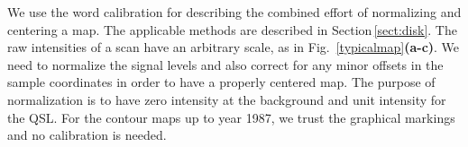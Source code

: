 \documentclass{aa}
\begin{document}
We use the word calibration for describing the combined effort of normalizing and centering a map. The applicable 
methods are described in Section\,\ref{sect:disk}. The raw intensities of a scan have an arbitrary scale, as in Fig.~\ref{typicalmap}{\bf(a-c)}. We 
need to normalize the signal levels and also correct for any minor offsets in the sample coordinates in order to have a 
properly centered map. The purpose of normalization is to have zero intensity at the background and unit intensity for 
the QSL. For the contour maps up to year 1987, we trust the graphical markings and no calibration is needed.





\end{document}
